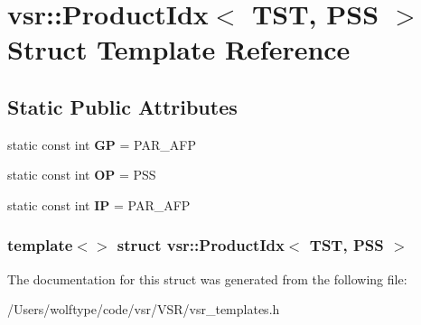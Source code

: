 \hypertarget{structvsr_1_1_product_idx_3_01_t_s_t_00_01_p_s_s_01_4}{\section{vsr\-:\-:Product\-Idx$<$ T\-S\-T, P\-S\-S $>$ Struct Template Reference}
\label{structvsr_1_1_product_idx_3_01_t_s_t_00_01_p_s_s_01_4}
}
\subsection*{Static Public Attributes}
\begin{DoxyCompactItemize}
\item 
\hypertarget{structvsr_1_1_product_idx_3_01_t_s_t_00_01_p_s_s_01_4_a4292a64566d7da03da2ed0c6526df637}{static const int {\bfseries G\-P} = P\-A\-R\-\_\-\-A\-F\-P}\label{structvsr_1_1_product_idx_3_01_t_s_t_00_01_p_s_s_01_4_a4292a64566d7da03da2ed0c6526df637}

\item 
\hypertarget{structvsr_1_1_product_idx_3_01_t_s_t_00_01_p_s_s_01_4_afa1ee561a9c3c4e477e913a356bb93ce}{static const int {\bfseries O\-P} = P\-S\-S}\label{structvsr_1_1_product_idx_3_01_t_s_t_00_01_p_s_s_01_4_afa1ee561a9c3c4e477e913a356bb93ce}

\item 
\hypertarget{structvsr_1_1_product_idx_3_01_t_s_t_00_01_p_s_s_01_4_a5c0497e0dab7bb4aafd93b31ef0d2abf}{static const int {\bfseries I\-P} = P\-A\-R\-\_\-\-A\-F\-P}\label{structvsr_1_1_product_idx_3_01_t_s_t_00_01_p_s_s_01_4_a5c0497e0dab7bb4aafd93b31ef0d2abf}

\end{DoxyCompactItemize}
\subsubsection*{template$<$$>$ struct vsr\-::\-Product\-Idx$<$ T\-S\-T, P\-S\-S $>$}



The documentation for this struct was generated from the following file\-:\begin{DoxyCompactItemize}
\item 
/\-Users/wolftype/code/vsr/\-V\-S\-R/vsr\-\_\-templates.\-h\end{DoxyCompactItemize}
